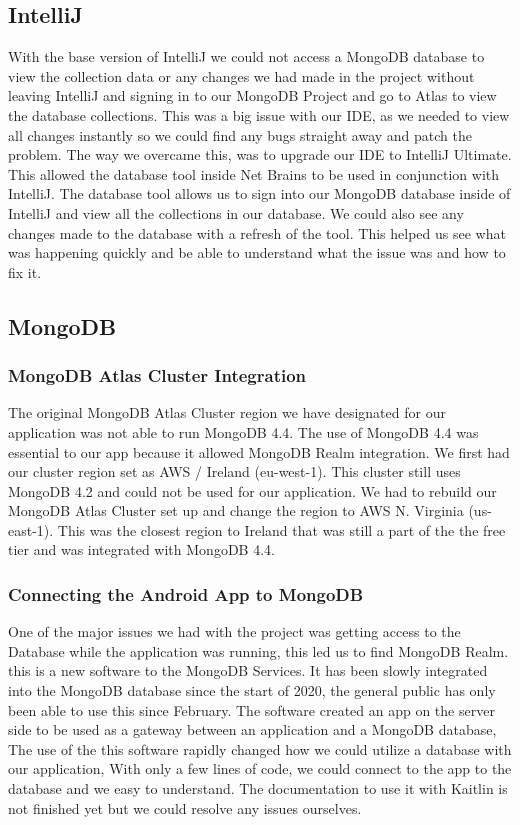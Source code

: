 \subsection{IntelliJ}
With the base version of IntelliJ we could not access a MongoDB database to view the collection data or any changes we had made in the project without leaving IntelliJ and signing in to our MongoDB Project and go to Atlas to view the database collections. This was a big issue with our IDE, as we needed to view all changes instantly so we could find any bugs straight away and patch the problem. \newline
The way we overcame this, was to upgrade our IDE to IntelliJ Ultimate. This allowed the database tool inside Net Brains to be used in conjunction with IntelliJ. The database tool allows us to sign into our MongoDB database inside of IntelliJ and view all the collections in our database. We could also see any changes made to the database with a refresh of the tool. This helped us see what was happening quickly and be able to understand what the issue was and how to fix it.
\newpage
\subsection{MongoDB}
\subsubsection{MongoDB Atlas Cluster Integration}
The original MongoDB Atlas Cluster region we have designated for our application was not able to run MongoDB 4.4. The use of MongoDB 4.4 was essential to our app because it allowed MongoDB Realm integration. We first had our cluster region set as AWS / Ireland (eu-west-1). This cluster still uses MongoDB 4.2 and could not be used for our application. We had to rebuild our MongoDB Atlas Cluster set up and change the region to AWS N. Virginia (us-east-1). This was the closest region to Ireland that was still a part of the the free tier and was integrated with MongoDB 4.4.

\subsubsection{Connecting the Android App to MongoDB}
One of the major issues we had with the project was getting access to the Database while the application was running, this led us to find MongoDB Realm. this is a new software to the MongoDB Services. It has been slowly integrated into the MongoDB database since the start of 2020, the general public has only been able to use this since February. The software created an app on the server side to be used as a gateway between an application and a MongoDB database, The use of the this software rapidly changed how we could utilize a database with our application, With only a few lines of code, we could connect to the app to the database and we easy to understand. The documentation to use it with Kaitlin is not finished yet but we could resolve any issues ourselves.
